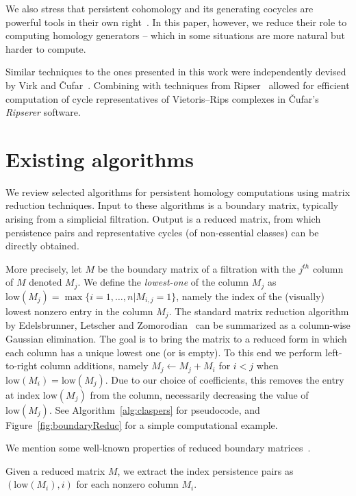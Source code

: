 We also stress that persistent cohomology and its generating cocycles are powerful tools in their own right~\cite{de2009persistent, scoccola2022toroidal}. In this paper, however, we reduce their role to  computing homology generators -- which in some situations are more natural but harder to compute.

Similar techniques to the ones presented in this work were independently devised by Virk and \v{C}ufar~\cite{ziga}. Combining with techniques from Ripser~\cite{bauer2021ripser} allowed for efficient computation of cycle representatives of Vietoris--Rips complexes in \v{C}ufar's \emph{Ripserer} software.

\section{Existing algorithms}
\label{sec:algs}
We review selected algorithms for persistent homology computations using matrix reduction techniques. Input to these algorithms is a boundary matrix, typically arising from a simplicial filtration. Output is a reduced matrix, from which persistence pairs and representative cycles (of non-essential classes) can be directly obtained.

More precisely, let $M$ be the boundary matrix of a filtration with the $j^{th}$ column of $M$ denoted $M_j$. We define the \textit{lowest-one} of the column $M_j$ as $\text{low}(M_j)=\max\{i=1,\dots,n | M_{i,j}=1\}$, namely the index of the (visually) lowest nonzero entry in the column $M_j$.  
 The standard matrix reduction algorithm by Edelsbrunner, Letscher and Zomorodian~\cite{edelsbrunner2000topological} can be summarized as a column-wise Gaussian elimination. The goal is to bring the matrix to a reduced form in which each column has a unique lowest one (or is empty). To this end we perform left-to-right column additions, namely $M_{j}\gets M_j+M_i$ for $i < j$ when $\text{low}(M_i)=\text{low}(M_j)$. Due to our choice of coefficients, this removes the entry at index $\text{low}(M_j)$ from the column, necessarily decreasing the value of $\text{low}(M_j)$. See Algorithm~\ref{alg:claspers} for pseudocode, and Figure~\ref{fig:boundaryReduc} for a simple computational example.

We mention some well-known properties of reduced boundary matrices~\cite{edelsbrunner2010computational}.

\begin{property}
\label{prop:index_pers}
Given a reduced matrix $M$, we extract the index persistence pairs as $(\text{low}(M_i), i)$ for each nonzero column $M_i$.     
\end{property}

